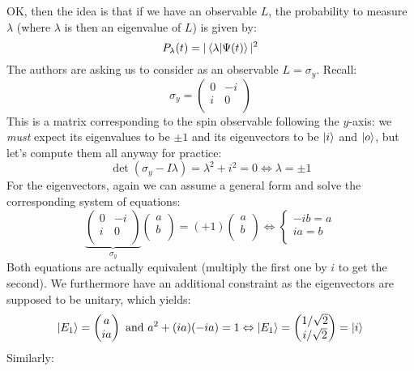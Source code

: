 \documentclass[solutions.tex]{subfiles}
\begin{document}
OK, then the idea is that if we have an observable $L$, the probability
to measure $\lambda$ (where $\lambda$ is then an eigenvalue of $L$) is
given by:
\[
	P_\lambda(t) = |\left\langle \lambda \middle| \Psi(t) \right\rangle|^2
\]
The authors are asking us to consider as an observable $L=\sigma_y$. Recall:
\[
	\sigma_y = \begin{pmatrix}
		0 & -i \\
		i & 0  \\
	\end{pmatrix}
\]
This is a matrix corresponding to the spin observable following the $y$-axis:
we \textit{must} expect its eigenvalues to be $\pm 1$ and its eigenvectors
to be $|i\rangle$ and $|o\rangle$, but let's compute them all anyway for practice:
\[
	\det(\sigma_y-I\lambda) = \lambda^2+i^2 = 0
	\Leftrightarrow \lambda = \pm 1
\]
For the eigenvectors, again we can assume a general form and solve
the corresponding system of equations:
\[
	\underbrace{\begin{pmatrix}
		0 & -i \\
		i &  0 \\
	\end{pmatrix}}_{\sigma_y} \begin{pmatrix} a \\ b \\ \end{pmatrix}
		= (+1)\begin{pmatrix} a \\ b \\ \end{pmatrix}
	\Leftrightarrow \begin{cases}
		-ib = a \\
		ia = b \\
	\end{cases}
\]
Both equations are actually equivalent (multiply the first one by $i$
to get the second). We furthermore have an additional constraint as
the eigenvectors are supposed to be unitary, which yields:
\[
	|E_1\rangle = \begin{pmatrix}
		a \\
		ia \\
	\end{pmatrix} \text{ and } a^2+(ia)(-ia) = 1
	\Leftrightarrow
	|E_1\rangle = \begin{pmatrix}
		1/\sqrt2 \\
		i/\sqrt2 \\
	\end{pmatrix} = |i\rangle
\]
Similarly:
\end{document}
